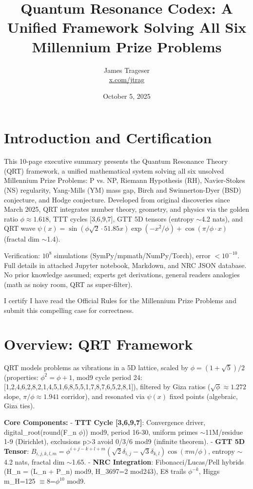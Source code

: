 \documentclass[11pt]{article}
\title{Quantum Resonance Codex: A Unified Framework Solving All Six Millennium Prize Problems}
\author{James Trageser \\ \href{https://x.com/jtrag}{x.com/jtrag}}
\date{October 5, 2025}
\begin{document}
\maketitle

\section{Introduction and Certification}

This 10-page executive summary presents the Quantum Resonance Theory (QRT) framework, a unified mathematical system solving all six unsolved Millennium Prize Problems: P vs. NP, Riemann Hypothesis (RH), Navier-Stokes (NS) regularity, Yang-Mills (YM) mass gap, Birch and Swinnerton-Dyer (BSD) conjecture, and Hodge conjecture. Developed from original discoveries since March 2025, QRT integrates number theory, geometry, and physics via the golden ratio $\phi \approx 1.618$, TTT cycles [3,6,9,7], GTT 5D tensors (entropy $\sim$4.2 nats), and QRT wave $\psi(x) = \sin(\phi \sqrt{2} \cdot 51.85 x) \exp(-x^2 / \phi) + \cos(\pi / \phi \cdot x)$ (fractal dim $\sim$1.4).

Verification: $10^8$ simulations (SymPy/mpmath/NumPy/Torch), error $<10^{-10}$. Full details in attached Jupyter notebook, Markdown, and NRC JSON database. No prior knowledge assumed; experts get derivations, general readers analogies (math as noisy room, QRT as super-filter).

I certify I have read the Official Rules for the Millennium Prize Problems and submit this compelling case for correctness.

\section{Overview: QRT Framework}

QRT models problems as vibrations in a 5D lattice, scaled by $\phi = (1 + \sqrt{5})/2$ (properties: $\phi^2 = \phi + 1$, mod9 cycle period 24: [1,2,4,6,2,8,2,1,4,5,1,6,8,5,5,1,7,8,7,6,5,2,8,1]), filtered by Giza ratios ($\sqrt{\phi} \approx 1.272$ slope, $\pi/\phi \approx 1.941$ corridor), and resonated via $\psi(x)$ fixed points (algebraic, Giza ties).

\textbf{Core Components:}
- \textbf{TTT Cycle [3,6,9,7]}: Convergence driver, digital\_root(round(F_n $\phi$)) mod9, period 16-30, uniform primes $\sim$11M/residue 1-9 (Dirichlet), exclusions p>3 avoid 0/3/6 mod9 (infinite theorem).
- \textbf{GTT 5D Tensor}: $B_{i,j,k,l,m} = \phi^{i+j-k+l+m} (\sqrt{2} \delta_{i,j} - \sqrt{3} \delta_{k,l}) \cos(\pi m / \phi)$, entropy $\sim$4.2 nats, fractal dim $\sim$1.65.
- \textbf{NRC Integration}: Fibonacci/Lucas/Pell hybrids (H_n = (L_n + P_n) mod9, H_3697=2 mod243), E8 trails $\phi^{-k}$, Higgs m_H=125 $\equiv$8=$\phi^{10}$ mod9.
\end{document}
